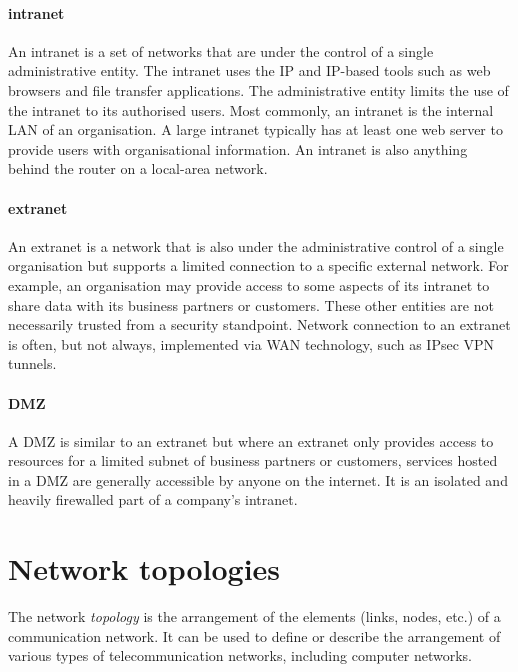 \paragraph{intranet}
An intranet is a set of networks that are under the control of a single administrative entity.
The intranet uses the \gls{IP} and \gls{IP}-based tools such as web browsers and file transfer applications.
The administrative entity limits the use of the intranet to its authorised users.
Most commonly, an intranet is the internal \gls{LAN} of an organisation.
A large intranet typically has at least one web server to provide users with organisational information.
An intranet is also anything behind the router on a local-area network.

\paragraph{extranet}
An extranet is a network that is also under the administrative control of a single organisation but supports a limited connection to a specific external network.
For example, an organisation may provide access to some aspects of its intranet to share data with its business partners or customers.
These other entities are not necessarily trusted from a security standpoint.
Network connection to an extranet is often, but not always, implemented via \gls{WAN} technology, such as IPsec \acs{VPN} tunnels.

\paragraph{\gls{DMZ}}
A \gls{DMZ} is similar to an extranet but where an extranet only provides access to resources for a limited subnet of business partners or customers, services hosted in a \gls{DMZ} are generally accessible by anyone on the internet.
It is an isolated and heavily firewalled part of a company's intranet.


\section{Network topologies}
\label{sec:network-topologies}

The network \emph{topology} is the arrangement of the elements (links, nodes, etc.) of a communication network.
It can be used to define or describe the arrangement of various types of telecommunication networks, including computer networks.

